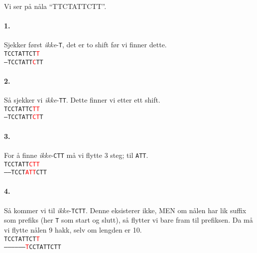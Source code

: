 		\begin{example}
		Vi ser på nåla ``TTCTATTCTT''.

\paragraph{1.} Sjekker først \textit{ikke}-\texttt{T}, det er to shift før vi finner dette.
\\
\noindent\texttt{TCCTATTCT\textcolor{red}{T}}\\
\texttt{---TCCTATT\textcolor{red}{C}TT}

\paragraph{2.} Så sjekker vi \textit{ikke}-\texttt{TT}. Dette finner vi etter ett shift.
\\
\noindent\texttt{TCCTATTC\textcolor{red}{TT}}\\
\texttt{--TCCTATT\textcolor{red}{CT}T}

\paragraph{3.} For å finne \textit{ikke}-\texttt{CTT} må vi flytte 3 steg; til \texttt{ATT}.
\\
\noindent\texttt{TCCTATT\textcolor{red}{CTT}}\\
\texttt{------TCCT\textcolor{red}{ATT}CTT}

\paragraph{4.} Så kommer vi til \textit{ikke}-\texttt{TCTT}. Denne eksisterer ikke, MEN om nålen har lik suffix som prefiks (her \texttt{T} som start og slutt), så flytter vi bare fram til prefiksen. Da må vi flytte nålen 9 hakk, selv om lengden er 10.
\\
\noindent\texttt{TCCTATTCT\textcolor{red}{T}}\\
\texttt{------------------\textcolor{red}{T}CCTATTCTT}


\end{example}
